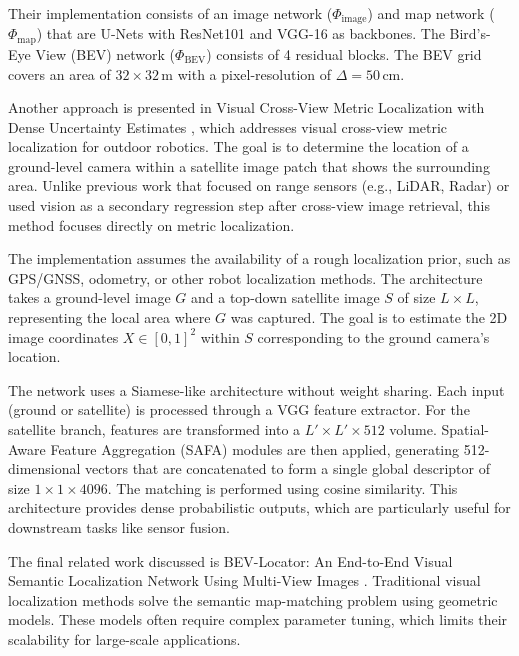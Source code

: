 Their implementation consists of an image network (\( \Phi_{\text{image}} \)) and map network (\( \Phi_{\text{map}} \)) that are U-Nets with ResNet101 and VGG-16 as backbones. The Bird’s-Eye View (BEV) network (\( \Phi_{\text{BEV}} \)) consists of 4 residual blocks. The BEV grid covers an area of \( 32 \times 32 \, \text{m} \) with a pixel-resolution of \( \Delta = 50 \, \text{cm} \).


Another approach is presented in Visual Cross-View Metric Localization with Dense Uncertainty Estimates \cite{xia2022visualcrossviewmetriclocalization}, which addresses visual cross-view metric localization for outdoor robotics. The goal is to determine the location of a ground-level camera within a satellite image patch that shows the surrounding area. Unlike previous work that focused on range sensors (e.g., LiDAR, Radar) or used vision as a secondary regression step after cross-view image retrieval, this method focuses directly on metric localization. 

The implementation assumes the availability of a rough localization prior, such as GPS/GNSS, odometry, or other robot localization methods. The architecture takes a ground-level image \( G \) and a top-down satellite image \( S \) of size \( L \times L \), representing the local area where \( G \) was captured. The goal is to estimate the 2D image coordinates \( X \in [0, 1]^2 \) within \( S \) corresponding to the ground camera's location.

The network uses a Siamese-like architecture without weight sharing. Each input (ground or satellite) is processed through a VGG feature extractor. For the satellite branch, features are transformed into a \( L' \times L' \times 512 \) volume. Spatial-Aware Feature Aggregation (SAFA) modules are then applied, generating 512-dimensional vectors that are concatenated to form a single global descriptor of size \( 1 \times 1 \times 4096 \). The matching is performed using cosine similarity. This architecture provides dense probabilistic outputs, which are particularly useful for downstream tasks like sensor fusion.

The final related work discussed is BEV-Locator: An End-to-End Visual Semantic Localization Network Using Multi-View Images \cite{zhang2022bevlocatorendtoendvisualsemantic}. Traditional visual localization methods solve the semantic map-matching problem using geometric models. These models often require complex parameter tuning, which limits their scalability for large-scale applications. 

